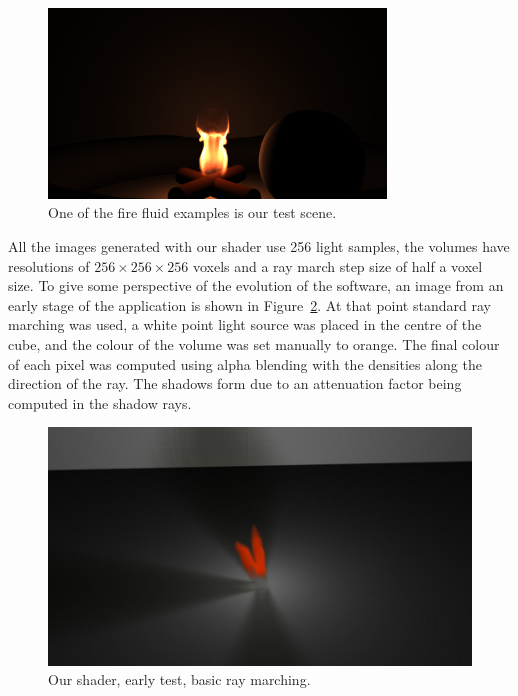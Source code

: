 \begin{figure}[htbp]
	\centering
	\includegraphics[width=0.8\textwidth, trim={8cm 0 8cm 10cm}, clip]{img/result_maya_fire_example}
	\caption{One of the \Maya fire fluid examples is our test scene.}
	\label{fig:result_maya_fire_example}
\end{figure}

All the images generated with our shader use 256 light samples, the volumes have resolutions of $256 \times 256 \times 256$ voxels and a ray march step size of half a voxel size.
To give some perspective of the evolution of the software, an image from an early stage of the application is shown in Figure~\ref{fig:result_early_stage}.
At that point standard ray marching was used, a white point light source was placed in the centre of the cube, and the colour of the volume was set manually to orange.
The final colour of each pixel was computed using alpha blending with the densities along the direction of the ray.
The shadows form due to an attenuation factor being computed in the shadow rays.

\begin{figure}[htbp]
	\centering
	\includegraphics[width=\textwidth]{img/result_early_stage}
	\caption{Our shader, early test, basic ray marching.}
	\label{fig:result_early_stage}
\end{figure}


